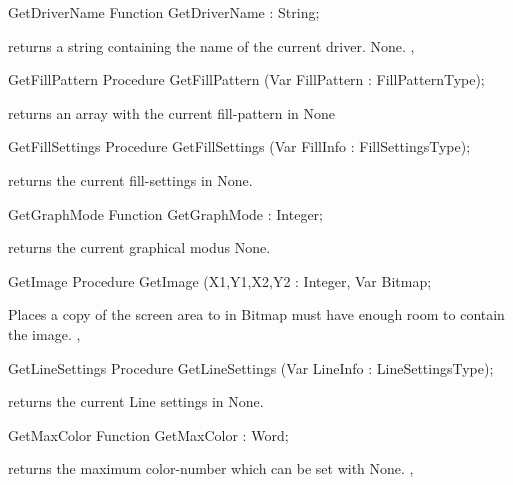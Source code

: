 \begin{function}{GetDriverName}
\Declaration
Function GetDriverName  : String;

\Description
{} returns a string containing the name of the
current driver.
\Errors
None.
\SeeAlso
{}, 
\end{function}
\begin{procedure}{GetFillPattern}
\Declaration
Procedure GetFillPattern (Var FillPattern : FillPatternType);

\Description
{} returns an array with the current fill-pattern  in 
\Errors
None
\SeeAlso
{}
\end{procedure}
\begin{procedure}{GetFillSettings}
\Declaration
Procedure GetFillSettings (Var FillInfo : FillSettingsType);

\Description
{} returns the current fill-settings in
\Errors
None.
\SeeAlso
{}
\end{procedure}
\begin{function}{GetGraphMode}
\Declaration
Function GetGraphMode  : Integer;

\Description
{} returns the current graphical modus
\Errors
None.
\SeeAlso
{}
\end{function}
\begin{procedure}{GetImage}
\Declaration
Procedure GetImage (X1,Y1,X2,Y2 : Integer, Var Bitmap;

\Description
{}
Places a copy of the screen area  to  in 
\Errors
Bitmap must have enough room to contain the image.
\SeeAlso
{},
\end{procedure}
\begin{procedure}{GetLineSettings}
\Declaration
Procedure GetLineSettings (Var LineInfo : LineSettingsType);

\Description
{} returns the current Line settings in
\Errors
None.
\SeeAlso
{}
\end{procedure}
\begin{function}{GetMaxColor}
\Declaration
Function GetMaxColor  : Word;

\Description
{} returns the maximum
color-number which can be set with 
\Errors
None.
\SeeAlso
{},
\end{function}
